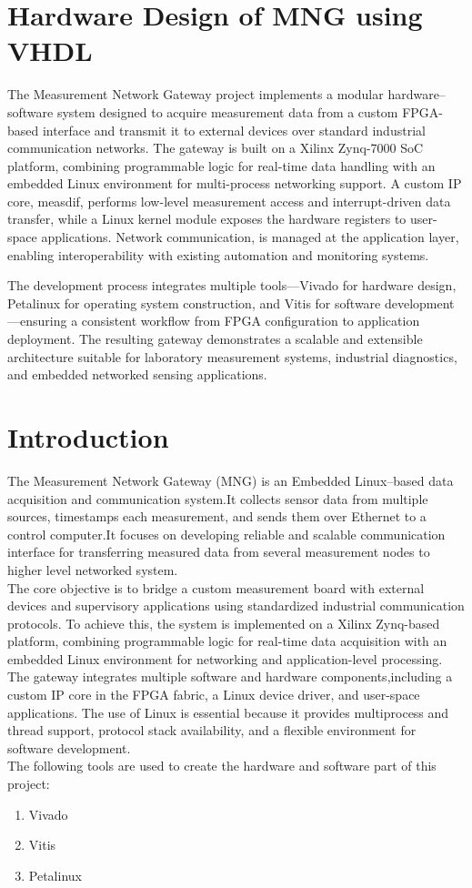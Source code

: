 \section{Hardware Design of MNG using VHDL} 
The Measurement Network Gateway project implements a modular hardware–software system designed to acquire measurement data from a custom FPGA-based interface and transmit it to external devices over standard industrial communication networks. The gateway is built on a Xilinx Zynq-7000 SoC platform, combining programmable logic for real-time data handling with an embedded Linux environment for multi-process networking support. A custom IP core, measdif, performs low-level measurement access and interrupt-driven data transfer, while a Linux kernel module exposes the hardware registers to user-space applications. Network communication, is managed at the application layer, enabling interoperability with existing automation and monitoring systems.

The development process integrates multiple tools—Vivado for hardware design, Petalinux for operating system construction, and Vitis for software development—ensuring a consistent workflow from FPGA configuration to application deployment. The resulting gateway demonstrates a scalable and extensible architecture suitable for laboratory measurement systems, industrial diagnostics, and embedded networked sensing applications.
\section{Introduction}
The Measurement Network Gateway (MNG) is an Embedded Linux–based data acquisition and communication system.It collects sensor data from multiple sources, timestamps each measurement, and sends them over Ethernet to a control computer.It focuses on developing reliable and scalable communication interface for transferring measured data from several measurement nodes to higher level networked system.\\
The core objective is to bridge a custom measurement board with external devices and supervisory applications using standardized industrial communication protocols. To achieve this, the system is implemented on a Xilinx Zynq-based platform, combining programmable logic for real-time data acquisition with an embedded Linux environment for networking and application-level processing.\\
The gateway integrates multiple software and hardware components,including a custom IP core in the FPGA fabric, a Linux device driver, and user-space applications. The use of Linux is essential because it provides multiprocess and thread support, protocol stack availability, and a flexible environment for software development.\\
The following tools are used to create the hardware and software part of this project: 
\begin{enumerate}
	\item Vivado 
	\item Vitis 
	\item Petalinux
\end{enumerate}
	
